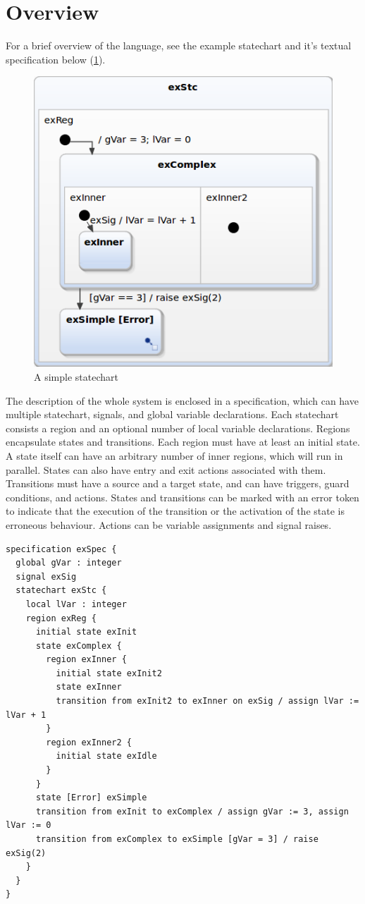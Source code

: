 \section{Overview}
For a brief overview of the language, see the example statechart and it's textual specification below (\cref{fig:verif}).
\begin{figure}[H]
	\centering
	\includegraphics[width=0.65\linewidth]{include/figures/chapter_4/stcex}
	\caption{A simple statechart}
	\label{fig:verif}
\end{figure}

The description of the whole system is enclosed in a specification, which can have multiple statechart, signals, and global variable declarations. Each statechart consists a region and an optional number of local variable declarations. Regions encapsulate states and transitions. Each region must have at least an initial state. A state itself can have an arbitrary number of inner regions, which will run in parallel. States can also have entry and exit actions associated with them. Transitions must have a source and a target state, and can have triggers, guard conditions, and actions. States and transitions can be marked with an error token to indicate that the execution of the transition or the activation of the state is erroneous behaviour. Actions can be variable assignments and signal raises.

\newpage
\begin{lstlisting}
specification exSpec {
  global gVar : integer
  signal exSig
  statechart exStc {
    local lVar : integer
    region exReg {
      initial state exInit
      state exComplex {
        region exInner {
          initial state exInit2
          state exInner
          transition from exInit2 to exInner on exSig / assign lVar := lVar + 1
        }
        region exInner2 {
          initial state exIdle
        }
      }
      state [Error] exSimple
      transition from exInit to exComplex / assign gVar := 3, assign lVar := 0
      transition from exComplex to exSimple [gVar = 3] / raise exSig(2)
    }
  }
}
\end{lstlisting}


